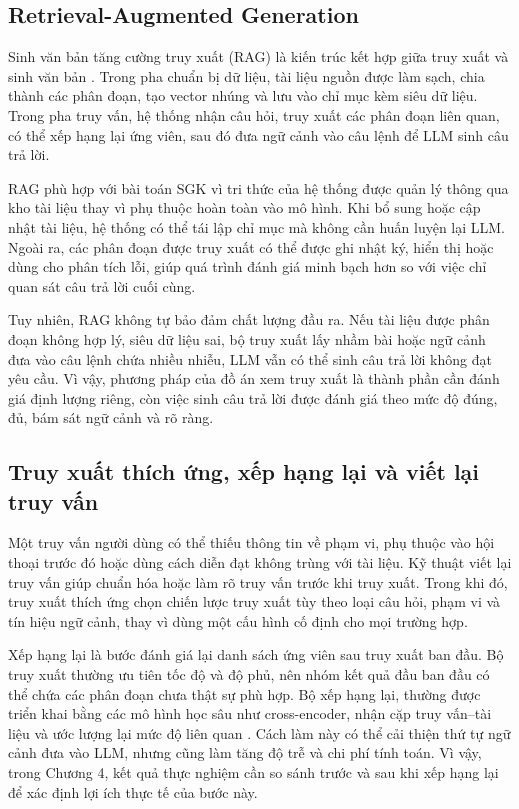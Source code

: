 \documentclass[../DoAn.tex]{subfiles}
\begin{document}
\subsection{Retrieval-Augmented Generation}

Sinh văn bản tăng cường truy xuất (RAG) là kiến trúc kết hợp giữa truy xuất và sinh văn bản \cite{lewis2020rag}. Trong pha chuẩn bị dữ liệu, tài liệu nguồn được làm sạch, chia thành các phân đoạn, tạo vector nhúng và lưu vào chỉ mục kèm siêu dữ liệu. Trong pha truy vấn, hệ thống nhận câu hỏi, truy xuất các phân đoạn liên quan, có thể xếp hạng lại ứng viên, sau đó đưa ngữ cảnh vào câu lệnh để LLM sinh câu trả lời.

RAG phù hợp với bài toán SGK vì tri thức của hệ thống được quản lý thông qua kho tài liệu thay vì phụ thuộc hoàn toàn vào mô hình. Khi bổ sung hoặc cập nhật tài liệu, hệ thống có thể tái lập chỉ mục mà không cần huấn luyện lại LLM. Ngoài ra, các phân đoạn được truy xuất có thể được ghi nhật ký, hiển thị hoặc dùng cho phân tích lỗi, giúp quá trình đánh giá minh bạch hơn so với việc chỉ quan sát câu trả lời cuối cùng.

Tuy nhiên, RAG không tự bảo đảm chất lượng đầu ra. Nếu tài liệu được phân đoạn không hợp lý, siêu dữ liệu sai, bộ truy xuất lấy nhầm bài hoặc ngữ cảnh đưa vào câu lệnh chứa nhiều nhiễu, LLM vẫn có thể sinh câu trả lời không đạt yêu cầu. Vì vậy, phương pháp của đồ án xem truy xuất là thành phần cần đánh giá định lượng riêng, còn việc sinh câu trả lời được đánh giá theo mức độ đúng, đủ, bám sát ngữ cảnh và rõ ràng.

\subsection{Truy xuất thích ứng, xếp hạng lại và viết lại truy vấn}

Một truy vấn người dùng có thể thiếu thông tin về phạm vi, phụ thuộc vào hội thoại trước đó hoặc dùng cách diễn đạt không trùng với tài liệu. Kỹ thuật viết lại truy vấn giúp chuẩn hóa hoặc làm rõ truy vấn trước khi truy xuất. Trong khi đó, truy xuất thích ứng chọn chiến lược truy xuất tùy theo loại câu hỏi, phạm vi và tín hiệu ngữ cảnh, thay vì dùng một cấu hình cố định cho mọi trường hợp.

Xếp hạng lại là bước đánh giá lại danh sách ứng viên sau truy xuất ban đầu. Bộ truy xuất thường ưu tiên tốc độ và độ phủ, nên nhóm kết quả đầu ban đầu có thể chứa các phân đoạn chưa thật sự phù hợp. Bộ xếp hạng lại, thường được triển khai bằng các mô hình học sâu như cross-encoder, nhận cặp truy vấn--tài liệu và ước lượng lại mức độ liên quan \cite{nogueira2019passage}. Cách làm này có thể cải thiện thứ tự ngữ cảnh đưa vào LLM, nhưng cũng làm tăng độ trễ và chi phí tính toán. Vì vậy, trong Chương 4, kết quả thực nghiệm cần so sánh trước và sau khi xếp hạng lại để xác định lợi ích thực tế của bước này.
\end{document}
